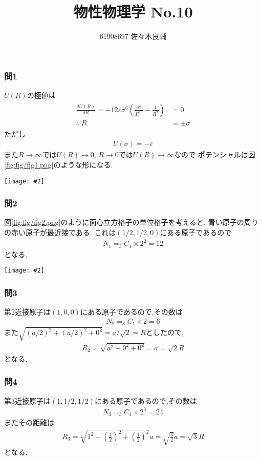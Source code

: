 \documentclass[uplatex,a4j,11pt,dvipdfmx]{jsarticle}
\makeatletter
\def\fgcaption{\def\@captype{figure}\caption}
\newcommand{\mfig}[3][width=15cm]{
\begin{center}
\texttt{[image: \#2]}
\fgcaption{#3 \label{fig:#2}}
\end{center}
}
\makeatother
\begin{document}
\title{物性物理学 No.10}
\author{61908697 佐々木良輔}
\date{}
\maketitle
\subsubsection*{問1}
$U(R)$の極値は
\begin{align}
  \begin{split}
    \frac{dU(R)}{dR}=-12\varepsilon\sigma^6\left(\frac{\sigma^6}{R^{13}}-\frac{1}{R^7}\right)&=0\\
    \therefore\ R&=\pm\sigma
  \end{split}
\end{align}
ただし
\begin{align}
  U(\sigma)=-\varepsilon
\end{align}
また$R\rightarrow\infty$では$U(R)\rightarrow 0$, $R\rightarrow 0$では$U(R)\rightarrow\infty$なので
ポテンシャルは図\ref{fig:fig/fig1.png}のような形になる.
\mfig[width=8cm]{fig/fig1.png}{ポテンシャルの概形}
\subsubsection*{問2}
図\ref{fig:fig/fig2.png}のように面心立方格子の単位格子を考えると,
青い原子の周りの赤い原子が最近接である.
これは$(1/2,1/2,0)$にある原子であるので
\begin{align}
  N_1=_3C_1\times 2^2=12
\end{align}
となる.
\mfig[width=8cm]{fig/fig2.png}{面心立方格子の配位数}
\subsubsection*{問3}
第2近接原子は$(1,0,0)$にある原子であるので,その数は
\begin{align}
  N_2=_3C_1\times2=6
\end{align}
また$\sqrt{(a/2)^2+(a/2)^2+0^2}=a/\sqrt{2}=R$としたので,
\begin{align}
  R_2=\sqrt{a^2+0^2+0^2}=a=\sqrt{2}R
\end{align}
となる.
\subsubsection*{問4}
第3近接原子は$(1,1/2,1/2)$にある原子であるので,その数は
\begin{align}
  N_3=_3C_1\times 2^3=24
\end{align}
またその距離は
\begin{align}
  R_3=\sqrt{1^2+\left(\frac{1}{2}\right)^2+\left(\frac{1}{2}\right)^2}a=\sqrt{\frac{3}{2}}a=\sqrt{3}R
\end{align}
となる.
\end{document}

